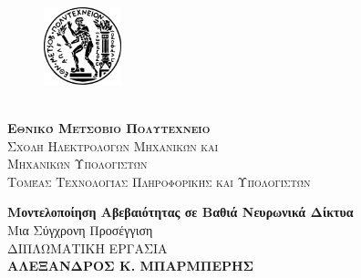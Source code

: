 \begin{titlepage}
    
    \thispagestyle{empty}    

    \vspace*{-1cm}
    
    \begingroup
        \setlength{\intextsep}{0pt}
        \setlength{\columnsep}{20pt}
        
        \begin{figure}
        \centering
        \includegraphics[width=0.2\textwidth]{images/logo/pyrforos.eps}
        
        \end{figure}
        \phantom{}\\[-7pt] %
        \LARGE{\textsc{\textbf{Εθνικό Μετσόβιο Πολυτεχνείο}}}\\[5pt]
        \Large{\textsc{Σχολή Ηλεκτρολόγων Μηχανικών
        και\\ Μηχανικών Υπολογιστών}}\\[5pt]
        \Large{\textsc{Τομέας Τεχνολογίας Πληροφορικής και Υπολογιστών}}

    \endgroup

    \begin{center}

        
        \vspace*{2cm}
            
        \Huge
        \textbf{Μοντελοποίηση Αβεβαιότητας σε Βαθιά Νευρωνικά Δίκτυα}\\
            
        \vspace{0.5cm}
        \LARGE
        Μια Σύγχρονη Προσέγγιση\\
            
        \vfill
        ΔΙΠΛΩΜΑΤΙΚΗ ΕΡΓΑΣΙΑ\\
        \vspace{0.8cm}
        \LARGE
        \textbf{ΑΛΕΞΑΝΔΡΟΣ Κ. ΜΠΑΡΜΠΕΡΗΣ}\\

        \vspace{1.0cm}
        \Large
        \begin{flushleft}
        \begin{tabbing}
            

\end{tabbing}
\end{flushleft}
\end{center}
\end{titlepage}
